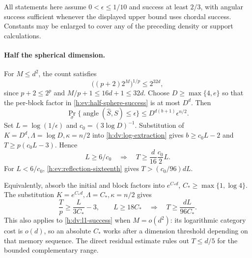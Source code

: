 All statements here assume \(0<\epsilon\le1/10\) and success at
least \(2/3\), with angular success sufficient whenever the displayed
upper bound uses chordal success. Constants may be enlarged to cover
any of the preceding density or support calculations.

\paragraph{Half the spherical dimension.}
For \(M\le d^2\), the count satisfies
\[
 \bigl((p+2)2^M\bigr)^{1/p}\le2^{32d},
\]
since \(p+2\le2^p\) and \(M/p+1\le16d+1\le32d\).
Choose \(D\ge\max\{4,e\}\) so that the per-block factor in
\eqref{h:ev:half-sphere-success} is at most \(D^d\). Then
\begin{equation}\label{h:ev:half-sphere-absolute}
 \Pr_\sigma\{\operatorname{angle}(\widehat S,S)\le\epsilon\}
 \le D^{d(b+1)}\epsilon^{n/2}.
\end{equation}
Set \(L=\log(1/\epsilon)\) and \(c_0=(3\log D)^{-1}\).
Substitution of \(K=D^d,\Lambda=\log D,\kappa=n/2\) into
\eqref{h:dv:log-extraction} gives
\(b\ge c_0L-2\) and \(T\ge p(c_0L-3)\). Hence
\begin{equation}\label{h:ev:half-sphere-threshold}
 L\ge6/c_0\quad\Longrightarrow\quad
 T\ge\frac d{16}\frac{c_0}{2}L.
\end{equation}
For \(L<6/c_0\), \eqref{h:ev:reflection-sixteenth} gives
\(T>(c_0/96)dL\).

Equivalently, absorb the initial and block factors into
\(e^{C_*d}\), \(C_*\ge\max\{1,\log4\}\). The substitution
\(K=e^{C_*d},\Lambda=C_*,\kappa=n/2\) gives
\begin{equation}\label{h:ev:exponential-threshold}
 \frac Tp\ge\frac{L}{3C_*}-3,\qquad
 L\ge18C_*\quad\Longrightarrow\quad T\ge\frac{dL}{96C_*}.
\end{equation}
This also applies to \eqref{h:dv:l1-success} when \(M=o(d^2)\):
its logarithmic category cost is \(o(d)\), so an absolute \(C_*\)
works after a dimension threshold depending on that memory sequence.
The direct residual estimate rules out \(T\le d/5\) for the bounded
complementary range.

